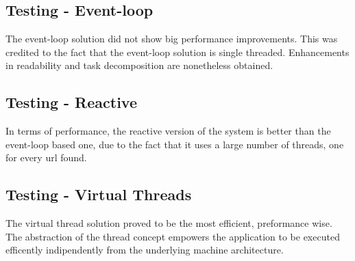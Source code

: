 \documentclass[12pt, a4paper]{report}
\begin{document}
\subsection{Testing - Event-loop}
The event-loop solution did not show big performance improvements. This was credited to the fact that the event-loop solution is single threaded.
 Enhancements in readability and task decomposition are nonetheless obtained.

\subsection{Testing - Reactive}
In terms of performance, the reactive version of the system is better than the event-loop based one, due to the fact that it uses a large number of threads, one for every url found.

\subsection{Testing - Virtual Threads}
The virtual thread solution proved to be the most efficient, preformance wise. The abstraction of the thread concept empowers the application to be executed
 efficently indipendently from the underlying machine architecture.


\end{document}
